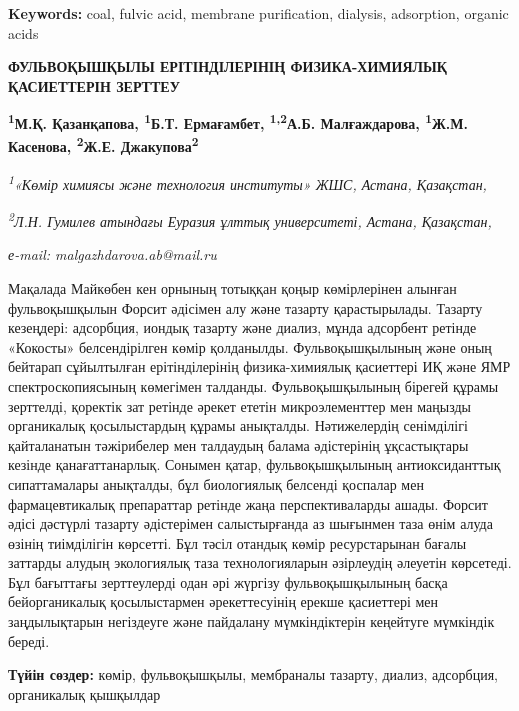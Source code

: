 {\bfseries Keywords:} coal, fulvic acid, membrane purification, dialysis,
adsorption, organic acids

\begin{articleheader}
{\bfseries ФУЛЬВОҚЫШҚЫЛЫ ЕРІТІНДІЛЕРІНІҢ ФИЗИКА-ХИМИЯЛЫҚ ҚАСИЕТТЕРІН ЗЕРТТЕУ}

{\bfseries
\textsuperscript{1}М.Қ. Қазанқапова,
\textsuperscript{1}Б.Т. Ермағамбет,
\textsuperscript{1,2}А.Б. Малғаждарова\textsuperscript{\envelope },
\textsuperscript{1}Ж.М. Касенова,
\textsuperscript{2}Ж.Е. Джакупова\textsuperscript{2}}
\end{articleheader}

\begin{affiliation}
\emph{\textsuperscript{1}«Көмір химиясы және технология институты» ЖШС,
Астана, Қазақстан,}

\emph{\textsuperscript{2}Л.Н. Гумилев атындағы Еуразия ұлттық
университеті, Астана, Қазақстан,}

\emph{е-mail: malgazhdarova.ab@mail.ru}
\end{affiliation}

Мақалада Майкөбен кен орнының тотыққан қоңыр көмірлерінен алынған
фульвоқышқылын Форсит әдісімен алу және тазарту қарастырылады. Тазарту
кезеңдері: адсорбция, иондық тазарту және диализ, мұнда адсорбент
ретінде «Кокосты» белсендірілген көмір қолданылды. Фульвоқышқылының және
оның бейтарап сұйылтылған ерітінділерінің физика-химиялық қасиеттері ИҚ
және ЯМР спектроскопиясының көмегімен талданды. Фульвоқышқылының бірегей
құрамы зерттелді, қоректік зат ретінде әрекет ететін микроэлементтер мен
маңызды органикалық қосылыстардың құрамы анықталды. Нәтижелердің
сенімділігі қайталанатын тәжірибелер мен талдаудың балама әдістерінің
ұқсастықтары кезінде қанағаттанарлық. Сонымен қатар, фульвоқышқылының
антиоксиданттық сипаттамалары анықталды, бұл биологиялық белсенді
қоспалар мен фармацевтикалық препараттар ретінде жаңа перспективаларды
ашады. Форсит әдісі дәстүрлі тазарту әдістерімен салыстырғанда аз
шығынмен таза өнім алуда өзінің тиімділігін көрсетті. Бұл тәсіл отандық
көмір ресурстарынан бағалы заттарды алудың экологиялық таза
технологияларын әзірлеудің әлеуетін көрсетеді. Бұл бағыттағы
зерттеулерді одан әрі жүргізу фульвоқышқылының басқа бейорганикалық
қосылыстармен әрекеттесуінің ерекше қасиеттері мен заңдылықтарын
негіздеуге және пайдалану мүмкіндіктерін кеңейтуге мүмкіндік береді.

{\bfseries Түйін сөздер:} көмір, фульвоқышқылы, мембраналы тазарту, диализ,
адсорбция, органикалық қышқылдар

